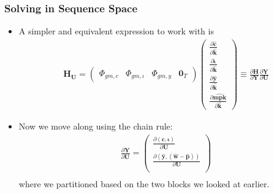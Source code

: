 \documentclass[english,xcolor=svgnames]{beamer}
\begin{document}
	
	\begin{frame}
		\frametitle{Solving in Sequence Space}
			\begin{itemize}
				\item A simpler and equivalent expression to work with is
				\begin{align*}
					\mathbf{H}_{\mathbf{U}} = \begin{pmatrix}
						\Phi_{gm,c} & \Phi_{gm,\iota} & \Phi_{gm,y}  & \mathbf{0}_T 
					\end{pmatrix}
					\begin{pmatrix}
						\frac{\partial\mathbf{\hat{c}}}{\partial \mathbf{\hat{k}} } \\ 
						\frac{\partial\mathbf{\hat{\iota}}}{\partial \mathbf{\hat{k}} } \\ 
						\frac{\partial\mathbf{\hat{y}}}{\partial \mathbf{\hat{k}} } \\
						\frac{\partial\mathbf{\hat{mpk}}}{\partial \mathbf{\hat{k}} } 
					\end{pmatrix} \equiv \frac{\partial \mathbf{H}}{\partial \mathbf{Y}}\frac{\partial \mathbf{Y}}{\partial \mathbf{U}}
				\end{align*}
				\item Now we move along using the chain rule:
				\begin{align*}
					\frac{\partial \mathbf{Y}}{\partial \mathbf{U}} = \begin{pmatrix}
						\frac{\partial \mathbf{(c,\iota)}}{\partial \mathbf{U}} \\
						\frac{\partial (\mathbf{\hat{y}},\mathbf{(\hat{w}-\hat{p})})}{\partial \mathbf{U}}\\
					\end{pmatrix} \\
				\end{align*}
				where we partitioned based on the two blocks we looked at earlier.
			\end{itemize}
	\end{frame}
	
\end{document}
